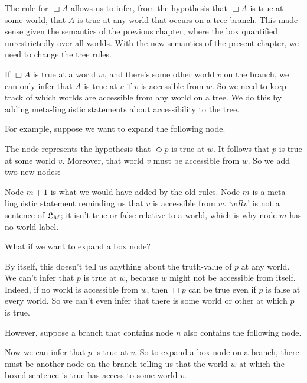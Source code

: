 \bigskip
\noindent
The rule for $\Box A$ allows us to infer, from the hypothesis that $\Box A$ is
true at some world, that $A$ is true at any world that occurs on a tree branch.
This made sense given the semantics of the previous chapter, where the box
quantified unrestrictedly over all worlds. With the new semantics of the present
chapter, we need to change the tree rules.

If $\Box A$ is true at a world $w$, and there's some other world $v$ on the
branch, we can only infer that $A$ is true at $v$ if $v$ is accessible from $w$.
So we need to keep track of which worlds are accessible from any world on a
tree. We do this by adding meta-linguistic statements about accessibility to the
tree.

For example, suppose we want to expand the following node.
%
\begin{center}
\end{center}
%
The node represents the hypothesis that $\Diamond p$ is true at $w$.
It follows that $p$ is true at some world $v$. Moreover, that world
$v$ must be accessible from $w$. So we add two new nodes:

\begin{center}
\end{center}
%
Node $m+1$ is what we would have added by the old rules. Node $m$ is a
meta-linguistic statement reminding us that $v$ is accessible from
$w$. `$wRv$' is not a sentence of $\mathfrak{L}_M$; it isn't true or false
relative to a world, which is why node $m$ has no world label.

What if we want to expand a box node?
%
\begin{center}
\end{center}
%
By itself, this doesn't tell us anything about the truth-value of $p$
at any world. We can't infer that $p$ is true at $w$, because $w$
might not be accessible from itself. Indeed, if no world is accessible
from $w$, then $\Box p$ can be true even if $p$ is false at every
world. So we can't even infer that there is some world or other at
which $p$ is true.

However, suppose a branch that contains node $n$ also contains the
following node.
\begin{center}
\end{center}
Now we can infer that $p$ is true at $v$. So to expand a box node on a
branch, there must be another node on the branch telling us that
the world $w$ at which the boxed sentence is true has access to some
world $v$.

